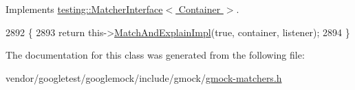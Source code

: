Implements \hyperlink{classtesting_1_1MatcherInterface_a296b43607cd99d60365f0e6a762777cf}{testing\+::\+Matcher\+Interface$<$ Container $>$}.


\begin{DoxyCode}
2892                                                                     \{
2893     \textcolor{keywordflow}{return} this->\hyperlink{classtesting_1_1internal_1_1QuantifierMatcherImpl_a01384d42781094ddc5d9208b63f23b3d}{MatchAndExplainImpl}(\textcolor{keyword}{true}, container, listener);
2894   \}
\end{DoxyCode}


The documentation for this class was generated from the following file\+:\begin{DoxyCompactItemize}
\item 
vendor/googletest/googlemock/include/gmock/\hyperlink{gmock-matchers_8h}{gmock-\/matchers.\+h}\end{DoxyCompactItemize}
